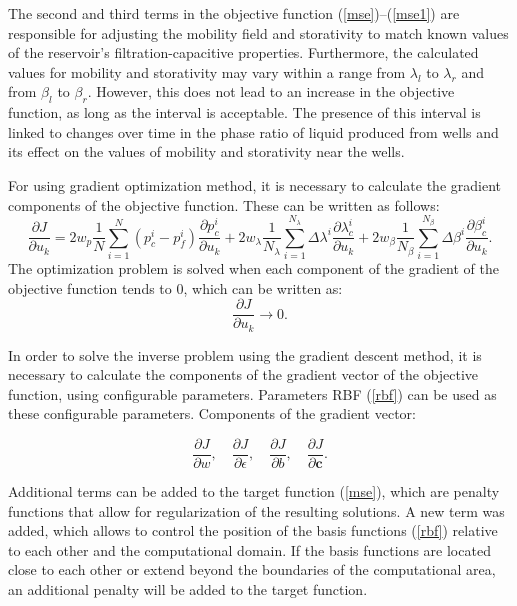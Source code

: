 \documentclass[
11pt,%
tightenlines,%
twoside,%
onecolumn,%
nofloats,%
nobibnotes,%
nofootinbib,%
superscriptaddress,%
noshowpacs,%
centertags]%
{revtex4}
\begin{document}
The second and third terms in the objective function ({\ref{mse}})--({\ref{mse1}}) are responsible for adjusting the mobility field and storativity to match known values of the reservoir's filtration-capacitive properties. Furthermore, the calculated values for mobility and storativity may vary within a range from $\lambda_l$ to $\lambda_r$ and from $\beta_l$ to $\beta_r$. However, this does not lead to an increase in the objective function, as long as the interval is acceptable. The presence of this interval is linked to changes over time in the phase ratio of liquid produced from wells and its effect on the values of mobility and storativity near the wells.

For using gradient optimization method, it is necessary to calculate the gradient components of the objective function. These can be written as follows:
\begin{equation*}\label{grad}
	\frac{\partial J}{\partial u_k} = 
	2w_p\frac{1}{N}\sum_{i=1}^N	({p_c^i-p_f^i}) \frac{\partial p_c^i}{\partial u_k}+
	2w_{\lambda}\frac{1}{N_\lambda}\sum_{i=1}^{N_\lambda}{\Delta\lambda^i}\frac{\partial
		\lambda_{c}^i}{\partial u_k}+
	2w_{\beta}\frac{1}{N_\beta}\sum_{i=1}^{N_\beta}{\Delta\beta^i}\frac{\partial
		\beta_{c}^i}{\partial u_k}.
\end{equation*}
The optimization problem is solved when each component of the gradient of the objective function tends to 0, which can be written as:
\begin{equation} \label{rp}
	\frac{\partial J}{\partial u_k} \rightarrow 0.
\end{equation}

In order to solve the inverse problem using the gradient descent method, it is necessary to calculate the components of the gradient vector of the objective function, using configurable parameters. Parameters RBF (\ref{rbf}) can be used as these configurable parameters. Components of the gradient vector:

\begin{equation*}
	\frac{\partial J}{\partial w},\quad \frac{\partial J}{\partial \epsilon},\quad \frac{\partial J}{\partial b}, \quad \frac{\partial J}{\partial \mathbf{c}}.
\end{equation*}

Additional terms can be added to the target function (\ref{mse}), which are penalty functions that allow for regularization of the resulting solutions. A new term was added, which allows  to control the position of the basis functions (\ref{rbf}) relative to each other and the computational domain. If the basis functions are located close to each other or extend beyond the boundaries of the computational area, an additional penalty will be added to the target function.
\end{document}

